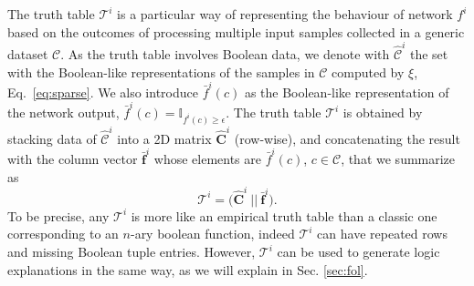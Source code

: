 \documentclass[withindex,glossary]{cam-thesis}
\theoremstyle{plain}
\theoremstyle{definition}
\theoremstyle{remark}
\begin{document}
The truth table $\mathcal{T}^i$ is a particular way of representing the behaviour of network $f^i$ based on the outcomes of
 processing multiple input samples collected in a generic dataset $\mathcal{C}$.
 As the truth table involves Boolean data, we denote with 
$\hat{\mathcal{C}}^i$ the set with the Boolean-like representations of the samples in $\mathcal{C}$ computed by $\xi$, Eq.~\ref{eq:sparse}.
We also introduce $\bar{f}^i(c)$ as the Boolean-like representation of the network output, $\bar{f}^i(c)=\mathbb{I}_{f^i(c)\geq \epsilon}$.
The truth table $\mathcal{T}^i$ is obtained by stacking data of $\hat{\mathcal{C}}^i$ into a 2D matrix $\hat{\mathbf{C}}^i$ (row-wise), and concatenating the result with the column vector $\bar{\mathbf{f}}^i$ whose elements are $\bar{f}^i(c)$, $c\in \mathcal{C}$, that we summarize as
\begin{equation} \label{eq:truth-table}
    \mathcal{T}^i = \Big( \hat{\mathbf{C}}^i \ \Big|\Big| \ \bar{\mathbf{f}}^i \Big).
\end{equation}
To be precise, any $\mathcal{T}^i$ is more like an empirical truth table than a classic one corresponding to an $n$-ary boolean function, indeed $\mathcal{T}^i$ can have repeated rows and missing Boolean tuple entries. However, $\mathcal{T}^i$ can be used to generate logic explanations in the same way, as we will explain in Sec. \ref{sec:fol}.
\end{document}
